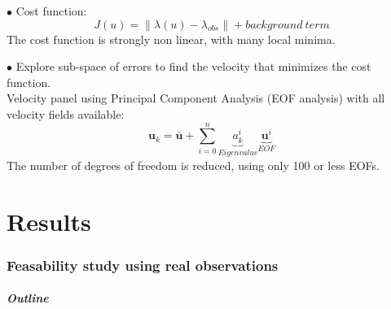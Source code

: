 \documentclass[compress,slidescentered,notes=show]{beamer}
\begin{document}
\begin{frame}
  \begin{block}{}
    $\bullet$ Cost function:
    $$J(u)=\|\lambda(u)- \lambda_{obs}\| + background\ term $$
    The cost function is strongly non linear, with many local minima.\\
  \end{block}
  \vspace{0.6cm}
  \begin{block}{}
    $\bullet$ Explore sub-space of errors to find the velocity that minimizes the cost function. \\
    Velocity panel using Principal Component Analysis (EOF analysis) with all velocity fields available:
    $$\textbf{u}_k = \bar{\textbf{u}} + \sum_{i=0}^n{\underbrace{a_k^i}_{Eigenvalue}\underbrace{\textbf{u}^i}_{EOF_{}}}$$
    The number of degrees of freedom is reduced, using only 100 or less EOFs. \\
  \end{block}
  \vspace{0.2cm}

\end{frame}

\part{Results}
\section[Real data]{Feasability study using real observations}
\begin{frame}
  \frametitle{Outline}
  \tableofcontents[currentsection]
\end{frame}
\end{document}
